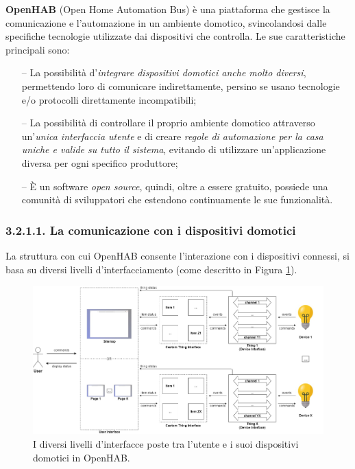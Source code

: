 \textbf{OpenHAB} (Open Home Automation Bus) è una piattaforma che gestisce la
comunicazione e l’automazione in un ambiente domotico, svincolandosi dalle
specifiche tecnologie utilizzate dai dispositivi che controlla. Le sue
caratteristiche principali sono:
\begin{itemize}
  \item[--] La possibilità d'\textit{integrare dispositivi domotici anche
          molto diversi}, permettendo loro di comunicare indirettamente,
        persino se usano tecnologie e/o protocolli direttamente
        incompatibili;
  \item[--] La possibilità di controllare il proprio ambiente domotico
        attraverso un’\textit{unica interfaccia utente} e di creare
        \textit{regole di automazione per la casa uniche e valide su tutto il
          sistema}, evitando di utilizzare un’applicazione diversa per ogni
        specifico produttore;
  \item[--] È un software \textit{open source}, quindi, oltre a essere
        gratuito, possiede una comunità di sviluppatori che estendono
        continuamente le sue funzionalità. \cite{OPENHAB_DOC}
\end{itemize}

\subsubsection{3.2.1.1. La comunicazione con i dispositivi domotici}
\label{subsec:Sezione3.2.1.1}

La struttura con cui OpenHAB consente l’interazione con i dispositivi connessi,
si basa su diversi livelli d'interfacciamento (come descritto in Figura
\ref{fig:figure3.3}).

\begin{figure}[!ht]
  \centering
  \includegraphics[scale=0.3]{resources/images/other/openhab-control-flow.jpg}
  \caption{
    I diversi livelli d'interfacce poste tra l'utente e i suoi dispositivi
    domotici in OpenHAB.
  }
  \label{fig:figure3.3}
\end{figure}

